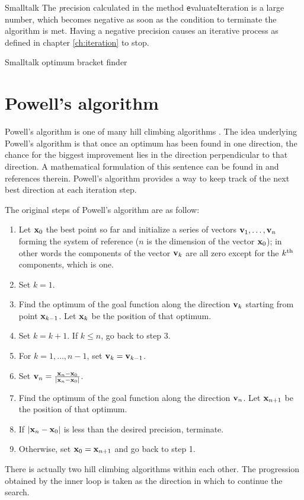 \begin{displaycode}{Smalltalk}
The {\textsl precision} calculated in the method {\texttt
evaluateIteration} is a large number, which becomes negative as
soon as the condition to terminate the algorithm is met. Having a
negative precision causes an iterative process as defined in
chapter \ref{ch:iteration} to stop.

\begin{listing} Smalltalk optimum bracket finder \label{ls:optimizerbracket}

\end{listing}


\section{Powell's algorithm}
\label{sec:powell}Powell's algorithm is one of many hill climbing
algorithms \cite{Press}. The idea underlying Powell's algorithm is
that once an optimum has been found in one direction, the chance
for the biggest improvement lies in the direction perpendicular to
that direction. A mathematical formulation of this sentence can be
found in \cite{Press} and references therein. Powell's algorithm
provides a way to keep track of the next best direction at each
iteration step.

\noindent The original steps of Powell's algorithm are as follow:
\begin{enumerate}
  \item Let ${\textbf x}_0$ the best point so far and initialize a
  series of vectors ${\textbf v}_1,\ldots,{\textbf v}_n$ forming the system
  of reference ($n$ is the
  dimension of the vector ${\textbf x}_0$); in
  other words the components of the vector ${\textbf v}_k$ are all
  zero except for the $k^{\mathop{\textrm{th}}}$ components, which is one.
  \item Set $k=1$.
  \item Find the optimum of the goal function along the direction ${\textbf
  v}_k$ starting from point ${\textbf x}_{k-1}$. Let ${\textbf x}_k$  be
  the position of that optimum.
  \item Set $k=k+1$. If $k\leq n$, go back to step 3.
  \item For $k=1,\ldots,n-1$, set ${\textbf v}_k={\textbf v}_{k-1}$.
  \item Set ${\textbf v}_n ={ {\textbf x}_n-{\textbf x}_0 \over \left| {\textbf x}_n-{\textbf x}_0\right|}$.
  \item Find the optimum of the goal function along the direction ${\textbf
  v}_n$. Let ${\textbf x}_{n+1}$  be the position of that optimum.
  \item If $\left| {\textbf x}_n-{\textbf x}_0\right|$ is less than the
  desired precision, terminate.
  \item Otherwise, set ${\textbf x}_0={\textbf x}_{n+1}$ and go back to
  step 1.
\end{enumerate}
There is actually two hill climbing algorithms within each other.
The progression obtained by the inner loop is taken as the
direction in which to continue the search.


\end{displaycode}
